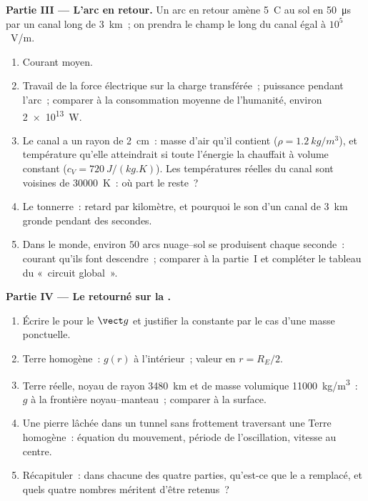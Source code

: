 \begin{problem}
\medskip
\noindent\textbf{Partie III --- L'arc en retour.}
Un arc en retour amène \qty{5}{C} au sol en \qty{50}{\micro s} par un canal
long de \qty{3}{km}~; on prendra le champ le long du canal égal à
$10^5$~V/m.
\begin{enumerate}[resume]
  \item Courant moyen.
  \item Travail de la force électrique sur la charge transférée~; puissance
        pendant l'arc~; comparer à la consommation moyenne de l'humanité,
        environ \qty{2e13}{W}.
  \item Le canal a un rayon de \qty{2}{cm}~: masse d'air qu'il contient
        ($\rho = \qty{1.2}{kg/m^3}$), et température qu'elle atteindrait si
        toute l'énergie la chauffait à volume constant ($c_V =
        \qty{720}{J/(kg.K)}$). Les températures réelles du canal sont voisines
        de \qty{30000}{K}~: où part le reste~?
  \item Le tonnerre~: retard par kilomètre, et pourquoi le son d'un canal de
        \qty{3}{km} gronde pendant des secondes.
  \item Dans le monde, environ $50$ arcs nuage--sol se produisent chaque
        seconde~: courant qu'ils font descendre~; comparer à la partie~I et
        compléter le tableau du «~circuit global~».
\end{enumerate}

\medskip
\noindent\textbf{Partie IV --- Le  retourné sur la .}
\begin{enumerate}[resume]
  \item Écrire le  pour le  $\vect g$ et
        justifier la constante par le cas d'une masse ponctuelle.
  \item Terre homogène~: $g(r)$ à l'intérieur~; valeur en $r = R_E/2$.
  \item Terre réelle, noyau de rayon \qty{3480}{km} et de masse volumique
        \qty{11000}{kg/m^3}~: $g$ à la frontière noyau--manteau~; comparer à
        la surface.
  \item Une pierre lâchée dans un tunnel sans frottement traversant une Terre
        homogène~: équation du mouvement, période de l'oscillation, vitesse au
        centre.
  \item Récapituler~: dans chacune des quatre parties, qu'est-ce que le
         a remplacé, et quels quatre nombres méritent d'être
        retenus~?
\end{enumerate}
\end{problem}
